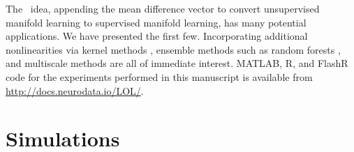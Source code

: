 \documentclass[10pt]{article}
\begin{document}




%
The \Lol~idea, appending the mean difference vector to convert unsupervised manifold learning to supervised manifold learning, has many potential applications.  We have presented the first few.  Incorporating additional nonlinearities via kernel methods \cite{Mika1999a}, ensemble methods such as random forests \cite{Breiman2001a}, and multiscale methods \cite{Allard2012}
are all of immediate interest. MATLAB, R, and FlashR code for the experiments performed in this manuscript is available from \url{http://docs.neurodata.io/LOL/}.

\clearpage
\appendix

\section{Simulations}
\end{document}
